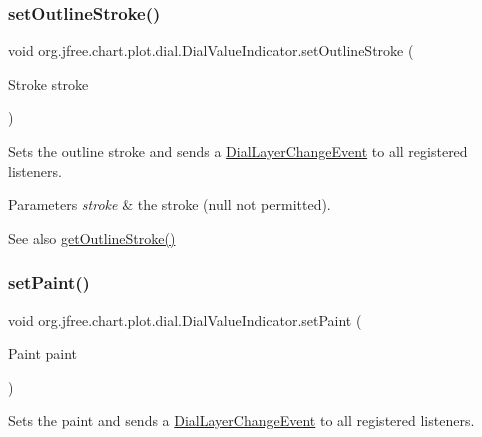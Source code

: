 \subsubsection{\texorpdfstring{set\+Outline\+Stroke()}{setOutlineStroke()}}
{\footnotesize\ttfamily void org.\+jfree.\+chart.\+plot.\+dial.\+Dial\+Value\+Indicator.\+set\+Outline\+Stroke (\begin{DoxyParamCaption}\item[{Stroke}]{stroke }\end{DoxyParamCaption})}

Sets the outline stroke and sends a \mbox{\hyperlink{classorg_1_1jfree_1_1chart_1_1plot_1_1dial_1_1_dial_layer_change_event}{Dial\+Layer\+Change\+Event}} to all registered listeners.


\begin{DoxyParams}{Parameters}
{\em stroke} & the stroke ({\ttfamily null} not permitted).\\
\hline
\end{DoxyParams}
\begin{DoxySeeAlso}{See also}
\mbox{\hyperlink{classorg_1_1jfree_1_1chart_1_1plot_1_1dial_1_1_dial_value_indicator_a34fd531229415c9f123614761f91aefa}{get\+Outline\+Stroke()}} 
\end{DoxySeeAlso}
\mbox{\label{classorg_1_1jfree_1_1chart_1_1plot_1_1dial_1_1_dial_value_indicator_a074b7cfef60b10d87247af98145343e2}} 
\subsubsection{\texorpdfstring{set\+Paint()}{setPaint()}}
{\footnotesize\ttfamily void org.\+jfree.\+chart.\+plot.\+dial.\+Dial\+Value\+Indicator.\+set\+Paint (\begin{DoxyParamCaption}\item[{Paint}]{paint }\end{DoxyParamCaption})}

Sets the paint and sends a \mbox{\hyperlink{classorg_1_1jfree_1_1chart_1_1plot_1_1dial_1_1_dial_layer_change_event}{Dial\+Layer\+Change\+Event}} to all registered listeners.


